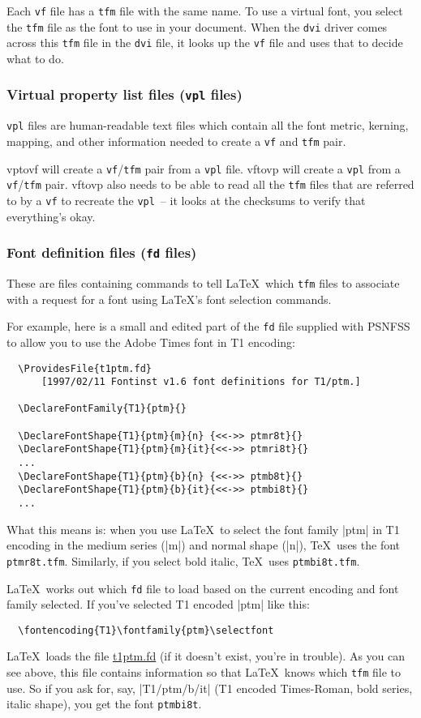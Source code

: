 \documentclass[a4paper]{ltxguide}
\newcommand*{\setfilename}[1]{\texttt{#1}}
\newcommand*{\setpackagename}[1]{\textsf{#1}}
\newcommand{\vf} {\setfilename{vf}\xspace}
\newcommand{\fd} {\setfilename{fd}\xspace}
\newcommand{\vpl}{\setfilename{vpl}\xspace}
\newcommand{\tfm}{\setfilename{tfm}\xspace}
\newcommand{\dvi}{\setfilename{dvi}\xspace}
\newcommand{\vftovp}{\setpackagename{vftovp}\xspace}
\newcommand{\vptovf}{\setpackagename{vptovf}\xspace}
\begin{document}
Each \vf file has a \tfm file with the same name.  To use a
virtual font, you select the \tfm file as the font to use in your
document.  When the \dvi driver comes across this \tfm file in the
\dvi file, it looks up the \vf file and uses that to decide what
to do.


\subsubsection{Virtual property list files (\vpl files)}

\vpl files are human-readable text files which contain all the
font metric, kerning, mapping, and other information needed to
create a \vf and \tfm pair.

\vptovf will create a \vf/\tfm pair from a \vpl file.  \vftovp
will create a \vpl from a \vf/\tfm pair.  \vftovp also needs to be
able to read all the \tfm files that are referred to by a \vf to
recreate the \vpl\ -- it looks at the checksums to verify that
everything's okay.


\subsubsection{Font definition files (\fd files)}

These are files containing commands to tell \LaTeX\ which \tfm
files to associate with a request for a font using \LaTeX's font
selection commands.

For example, here is a small and edited part of the \fd file
supplied with \setpackagename{PSNFSS} to allow you to use the
Adobe Times font in T1 encoding:

\begin{verbatim}
  \ProvidesFile{t1ptm.fd}
      [1997/02/11 Fontinst v1.6 font definitions for T1/ptm.]

  \DeclareFontFamily{T1}{ptm}{}

  \DeclareFontShape{T1}{ptm}{m}{n} {<<->> ptmr8t}{}
  \DeclareFontShape{T1}{ptm}{m}{it}{<<->> ptmri8t}{}
  ...
  \DeclareFontShape{T1}{ptm}{b}{n} {<<->> ptmb8t}{}
  \DeclareFontShape{T1}{ptm}{b}{it}{<<->> ptmbi8t}{}
  ...
\end{verbatim}
What this means is: when you use \LaTeX\ to select the font family
|ptm| in T1 encoding in the medium series (|m|) and normal shape
(|n|), \TeX\ uses the font \texttt{ptmr8t.tfm}.  Similarly, if you
select bold italic, \TeX\ uses \texttt{ptmbi8t.tfm}.

\LaTeX\ works out which \fd file to load based on the current
encoding and font family selected.  If you've selected T1 encoded
|ptm| like this:
\begin{verbatim}
  \fontencoding{T1}\fontfamily{ptm}\selectfont
\end{verbatim}
\LaTeX\ loads the file \url{t1ptm.fd} (if it doesn't exist, you're
in trouble).  As you can see above, this file contains information
so that \LaTeX\ knows which \tfm file to use.  So if you ask for,
say, |T1/ptm/b/it| (T1 encoded Times-Roman, bold series, italic
shape), you get the font \texttt{ptmbi8t}.
\end{document}
